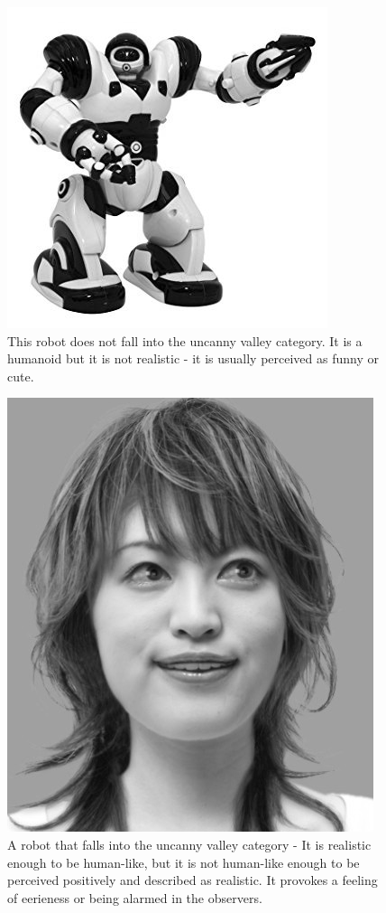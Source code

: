 \begin{figure}[H]
\centerline{\includegraphics[scale=0.4]{img/toyrobot.jpg}}
\caption{This robot does not fall into the uncanny valley category. It is a humanoid but it is not realistic - it is usually perceived as funny or cute.}\label{fig:toyrobot}
\end{figure}

\begin{figure}[H]
\centerline{\includegraphics[scale=0.4]{img/uncannyrobot.png}}
\caption{A robot that falls into the uncanny valley category - It is realistic enough to be human-like, but it is not human-like enough to be perceived positively and described as realistic. It provokes a feeling of eerieness or being alarmed in the observers.}\label{fig:uncannyrobot}
\end{figure}


